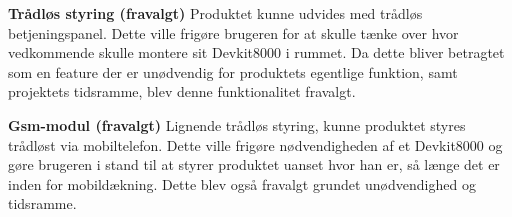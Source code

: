 \textbf{Trådløs styring (fravalgt)}
Produktet kunne udvides med trådløs betjeningspanel. Dette ville frigøre brugeren for at skulle tænke over hvor vedkommende skulle montere sit Devkit8000 i rummet. Da dette bliver betragtet som en feature der er unødvendig for produktets egentlige funktion, samt projektets tidsramme, blev denne funktionalitet fravalgt.  

\textbf{Gsm-modul (fravalgt)}
Lignende trådløs styring, kunne produktet styres trådløst via mobiltelefon. Dette ville frigøre nødvendigheden af et Devkit8000 og gøre brugeren i stand til at styrer produktet uanset hvor han er, så længe det er inden for mobildækning. Dette blev også fravalgt grundet unødvendighed og tidsramme. 

